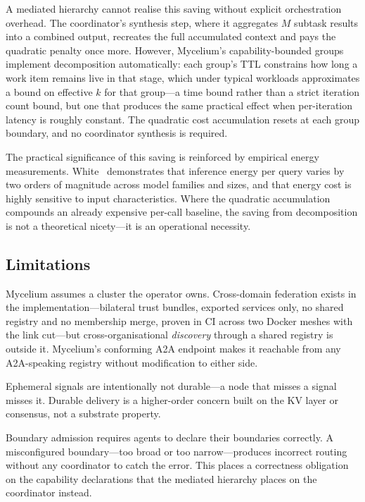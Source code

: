 \documentclass[11pt]{article}
\begin{document}
A mediated hierarchy cannot realise this saving without explicit orchestration
overhead. The coordinator's synthesis step, where it aggregates $M$ subtask
results into a combined output, recreates the full accumulated context and pays
the quadratic penalty once more. However, Mycelium's capability-bounded groups
implement decomposition automatically: each group's TTL constrains how long a work
item remains live in that stage, which under typical workloads approximates a bound
on effective $k$ for that group---a time bound rather than a strict iteration count
bound, but one that produces the same practical effect when per-iteration latency
is roughly constant. The quadratic cost accumulation resets at each group boundary,
and no coordinator synthesis is required.

The practical significance of this saving is reinforced by empirical energy
measurements. White~\cite{white2025} demonstrates that inference energy per
query varies by two orders of magnitude across model families and sizes, and
that energy cost is highly sensitive to input characteristics. Where the
quadratic accumulation compounds an already expensive per-call baseline, the
saving from decomposition is not a theoretical nicety---it is an operational
necessity.

\subsection{Limitations}

Mycelium assumes a cluster the operator owns. Cross-domain federation exists in the
implementation---bilateral trust bundles, exported services only, no shared registry
and no membership merge, proven in CI across two Docker meshes with the link cut---but
cross-organisational \emph{discovery} through a shared registry is outside it.
Mycelium's conforming A2A endpoint makes it reachable from any A2A-speaking
registry without modification to either side.

Ephemeral signals are intentionally not durable---a node that misses a signal
misses it. Durable delivery is a higher-order concern built on the KV layer or
consensus, not a substrate property.

Boundary admission requires agents to declare their boundaries correctly. A
misconfigured boundary---too broad or too narrow---produces incorrect routing
without any coordinator to catch the error. This places a correctness obligation
on the capability declarations that the mediated hierarchy places on the
coordinator instead.
\end{document}

